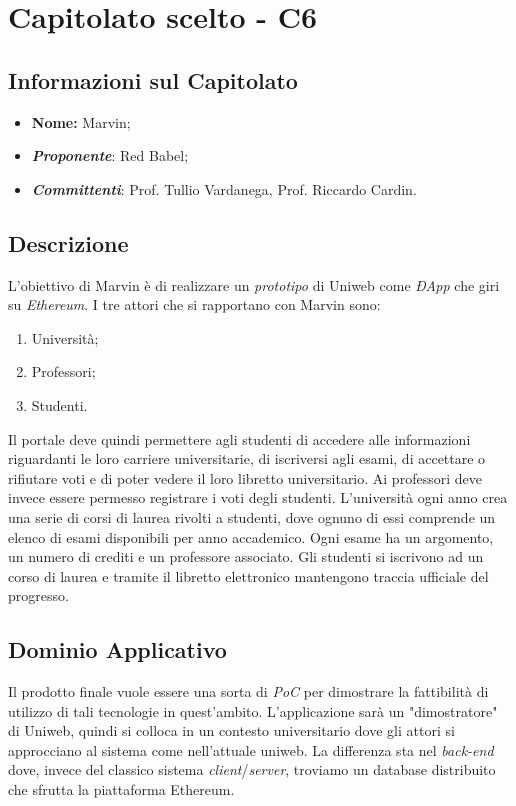 \newpage
\section{Capitolato scelto - C6}
\subsection{Informazioni sul Capitolato}
\begin{itemize}
	\item \textbf{Nome:} Marvin;
	\item \textbf{\textit{Proponente}}: Red Babel;
	\item \textbf{\textit{Committenti}}: Prof. Tullio Vardanega, Prof. Riccardo Cardin.
\end{itemize}

\subsection{Descrizione}
L'obiettivo di Marvin è di realizzare un \textit{prototipo} di Uniweb come \textit{ÐApp} che giri su \textit{Ethereum}. I tre attori che si rapportano con Marvin sono:
\begin{enumerate}
	\item Università;
	\item Professori;
	\item Studenti.
\end{enumerate}
Il portale deve quindi permettere agli studenti di accedere alle informazioni riguardanti le loro carriere universitarie, di iscriversi agli esami, di accettare o rifiutare voti e di poter vedere il loro libretto universitario.
Ai professori deve invece essere permesso registrare i voti degli studenti.
L'università ogni anno crea una serie di corsi di laurea rivolti a studenti, dove ognuno di essi comprende un elenco di esami disponibili per anno accademico. Ogni esame ha un argomento, un numero di crediti e un professore associato. Gli studenti si iscrivono ad un corso di laurea e tramite il libretto elettronico mantengono traccia ufficiale del progresso.

\subsection{Dominio Applicativo}
Il prodotto finale vuole essere una sorta di \textit{PoC} per dimostrare la fattibilità di utilizzo di tali tecnologie in quest'ambito. L'applicazione sarà un "dimostratore" di Uniweb, quindi si colloca in un contesto universitario dove gli attori si approcciano al sistema come nell'attuale uniweb. La differenza sta nel \textit{back-end} dove, invece del classico sistema \textit{client}/\textit{server}, troviamo un database distribuito che sfrutta la piattaforma Ethereum. 

